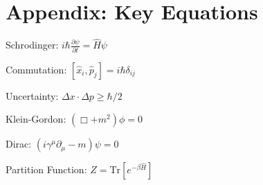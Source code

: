 \documentclass[12pt]{article}
\begin{document}
\section*{Appendix: Key Equations}

Schrodinger: $i\hbar\frac{\partial\psi}{\partial t} = \hat{H}\psi$

Commutation: $[\hat{x}_i, \hat{p}_j] = i\hbar\delta_{ij}$

Uncertainty: $\Delta x \cdot \Delta p \geq \hbar/2$

Klein-Gordon: $(\Box + m^2)\phi = 0$

Dirac: $(i\gamma^\mu\partial_\mu - m)\psi = 0$

Partition Function: $Z = \text{Tr}[e^{-\beta\hat{H}}]$
\end{document}
